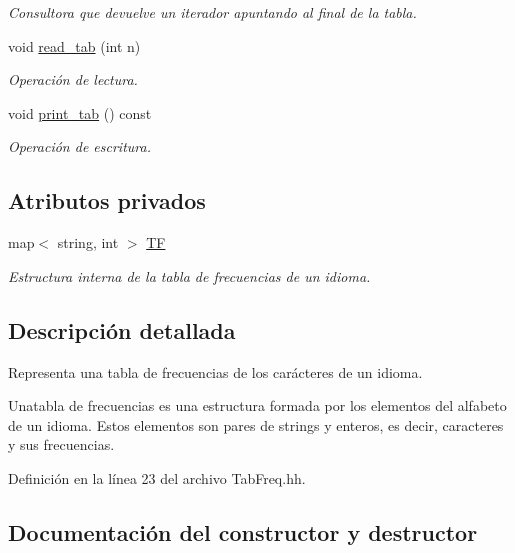 \begin{DoxyCompactItemize}
\begin{DoxyCompactList}\small\item\em Consultora que devuelve un iterador apuntando al final de la tabla. \end{DoxyCompactList}\item 
void \hyperlink{class_tab_freq_aa84cb3ed7c4958be0bfe4fbd8c6c0e6a}{read\+\_\+tab} (int n)
\begin{DoxyCompactList}\small\item\em Operación de lectura. \end{DoxyCompactList}\item 
void \hyperlink{class_tab_freq_a20d75c460199ab8ef3e189d9ad81c05b}{print\+\_\+tab} () const
\begin{DoxyCompactList}\small\item\em Operación de escritura. \end{DoxyCompactList}\end{DoxyCompactItemize}
\subsection*{Atributos privados}
\begin{DoxyCompactItemize}
\item 
map$<$ string, int $>$ \hyperlink{class_tab_freq_ae6be9a9671af1d897960648e10a62cfb}{TF}
\begin{DoxyCompactList}\small\item\em Estructura interna de la tabla de frecuencias de un idioma. \end{DoxyCompactList}\end{DoxyCompactItemize}


\subsection{Descripción detallada}
Representa una tabla de frecuencias de los carácteres de un idioma. 

Unatabla de frecuencias es una estructura formada por los elementos del alfabeto de un idioma. Estos elementos son pares de strings y enteros, es decir, caracteres y sus frecuencias. 

Definición en la línea 23 del archivo Tab\+Freq.\+hh.



\subsection{Documentación del constructor y destructor}
\mbox{\label{class_tab_freq_a0e429dc751718b7fc1c6ad3e127a0f98}} 
